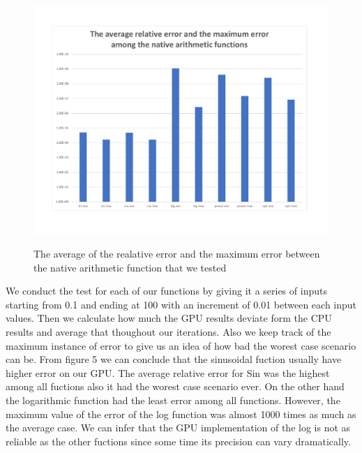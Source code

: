 \begin{figure}[!tbh]
 \centering  
    {\includegraphics[width=1.0\linewidth]{fig/histogram_comparison.pdf}}    
  \caption{The average of the realative error and the maximum error between the native arithmetic function that we tested }
   \label{fig:histogram_comparison}
\end{figure} 

We conduct the test for each of our functions by giving it a series of inputs starting from 0.1 and ending at 100 with an increment of 0.01 between each input values. Then we calculate how much the GPU results deviate form the CPU results and average that thoughout our iterations. Also we keep track of the maximum instance of error to give us an idea of how bad the worest case scenario can be. From figure 5 we can conclude that the sinusoidal fuction usually have higher error on our GPU. The average relative error for Sin was the highest among all fuctions also it had the worest case scenario ever. On the other hand the logarithmic function had the least error among all functions. However, the maximum value of the error of the log function was almost 1000 times as much as the average case. We can infer that the GPU implementation of the log is not as reliable as the other fuctions since some time its precision can vary dramatically.

